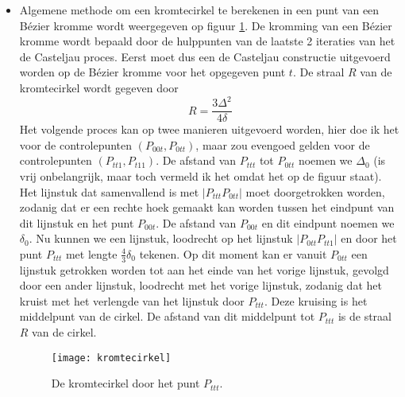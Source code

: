 \documentclass{report}
\begin{document}
\begin{itemize}
{\begin{itemize}
			\end{itemize}
		}
	{
		\begin{itemize} 
			\item Algemene methode om een kromtecirkel te berekenen in een punt van een Bézier kromme wordt weergegeven op figuur \ref{fig:kromtecirkel}. De kromming van een Bézier kromme wordt bepaald door de hulppunten van de laatste 2 iteraties van het de Casteljau proces. Eerst moet dus een de Casteljau constructie uitgevoerd worden op de Bézier kromme voor het opgegeven punt $t$. De straal $R$ van de kromtecirkel wordt gegeven door $$R = \frac{3\Delta^2}{4\delta}$$
			Het volgende proces kan op twee manieren uitgevoerd worden, hier doe ik het voor de controlepunten $(P_{00t}, P_{0tt})$, maar zou evengoed gelden voor de controlepunten $(P_{tt1}, P_{t11})$. De afstand van $P_{ttt}$ tot $P_{0tt}$ noemen we $\Delta_0$ (is vrij onbelangrijk, maar toch vermeld ik het omdat het op de figuur staat). Het lijnstuk dat samenvallend is met $|P_{ttt}P_{0tt}|$ moet doorgetrokken worden, zodanig dat er een rechte hoek gemaakt kan worden tussen het eindpunt van dit lijnstuk en het punt $P_{00t}$. De afstand van $P_{00t}$ en dit eindpunt noemen we $\delta_0$. Nu kunnen we een lijnstuk, loodrecht op het lijnstuk $|P_{0tt}P_{tt1}|$ en door het punt $P_{ttt}$ met lengte $\frac{4}{3} \delta_0$ tekenen. Op dit moment kan er vanuit $P_{0tt}$ een lijnstuk getrokken worden tot aan het einde van het vorige lijnstuk, gevolgd door een ander lijnstuk, loodrecht met het vorige lijnstuk, zodanig dat het kruist met het verlengde van het lijnstuk door $P_{ttt}$. Deze kruising is het middelpunt van de cirkel. De afstand van dit middelpunt tot $P_{ttt}$ is de straal $R$ van de cirkel.
			
			\begin{figure}[ht]
				\centering
				\texttt{[image: kromtecirkel]}
				\caption{De kromtecirkel door het punt $P_{ttt}$.}
				\label{fig:kromtecirkel}
			\end{figure}
		\end{itemize}
			
		}
\end{itemize}
\end{document}
